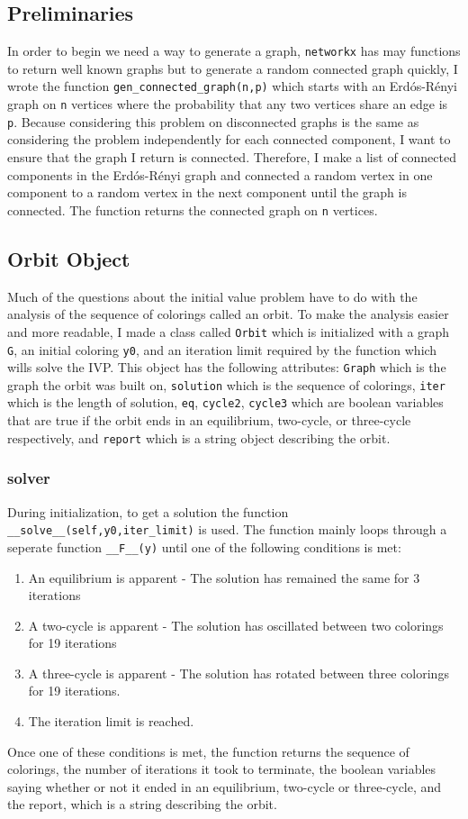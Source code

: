 \documentclass[]{article}
\begin{document}
\subsection{Preliminaries}
In order to begin we need a way to generate a graph, \verb*|networkx| has may functions to return well known graphs but to generate a random connected graph quickly, I wrote the function \verb*|gen_connected_graph(n,p)| which starts with an Erd\'os-R\'enyi graph on \verb*|n| vertices where the probability that any two vertices share an edge is \verb*|p|. Because considering this problem on disconnected graphs is the same as considering the problem independently for each connected component, I want to ensure that the graph I return is connected. Therefore, I make a list of connected components in the Erd\'os-R\'enyi graph and connected a random vertex in one component to a random vertex in the next component until the graph is connected. The function returns the connected graph on \verb*|n| vertices.   
\subsection{Orbit Object}
Much of the questions about the initial value problem have to do with the analysis of the sequence of colorings called an orbit. To make the analysis easier and more readable, I made a class called \verb*|Orbit| which is initialized with a graph \verb*|G|, an initial coloring \verb*|y0|, and an iteration limit required by the function which wills solve the IVP. This object has the following attributes: \verb*|Graph| which is the graph the orbit was built on, \verb*|solution| which is the sequence of colorings, \verb*|iter| which is the length of solution, \verb*|eq|, \verb*|cycle2|, \verb*|cycle3| which are boolean variables that are true if the orbit ends in an equilibrium, two-cycle, or three-cycle respectively, and \verb*|report| which is a string object describing the orbit. 
\subsubsection{solver}
During initialization, to get a solution the function \verb*|__solve__(self,y0,iter_limit)| is used. The function mainly loops through a seperate function \verb*|__F__(y)| until one of the following conditions is met:
\begin{enumerate}
	\item An equilibrium is apparent - The solution has remained the same for 3 iterations
	\item A two-cycle is apparent - The solution has oscillated between two colorings for 19 iterations
	\item A three-cycle is apparent - The solution has rotated between three colorings for 19 iterations. 
	\item The iteration limit is reached.
\end{enumerate}  
Once one of these conditions is met, the function returns the sequence of colorings, the number of iterations it took to terminate, the boolean variables saying whether or not it ended in an equilibrium, two-cycle or three-cycle, and the report, which is a string describing the orbit. 
\end{document}
